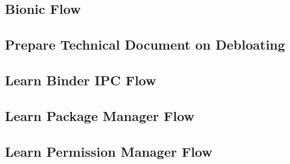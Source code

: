 \subsection{Bionic Flow}

\subsection{Prepare Technical Document on Debloating}

\subsection{Learn Binder IPC Flow}

\subsection{Learn Package Manager Flow}

\subsection{Learn Permission Manager Flow}

% 






